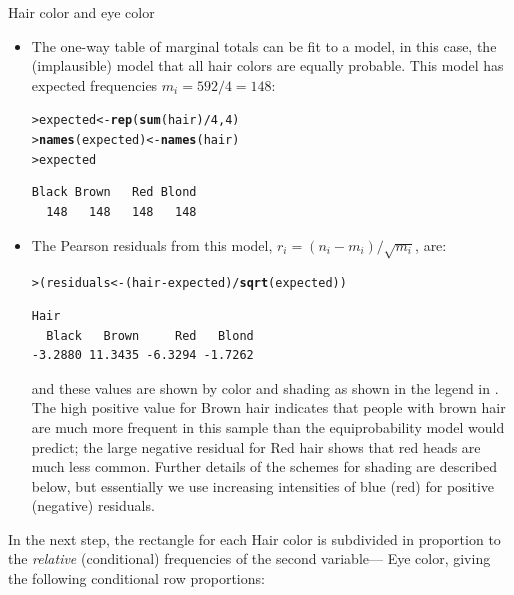 \documentclass[10pt,krantz2]{krantz}\usepackage[]{graphicx}\usepackage[]{color}
\makeatletter
\newcommand{\hlnum}[1]{\textcolor[rgb]{0.686,0.059,0.569}{#1}}%
\newcommand{\hlopt}[1]{\textcolor[rgb]{0,0,0}{#1}}%
\newcommand{\hlstd}[1]{\textcolor[rgb]{0.345,0.345,0.345}{#1}}%
\newcommand{\hlkwb}[1]{\textcolor[rgb]{0.69,0.353,0.396}{#1}}%
\newcommand{\hlkwd}[1]{\textcolor[rgb]{0.737,0.353,0.396}{\textbf{#1}}}%
\newenvironment{kframe}{%
 \def\at@end@of@kframe{}%
 \ifinner\ifhmode%
  \def\at@end@of@kframe{\end{minipage}}%
  \begin{minipage}{\columnwidth}%
 \fi\fi%
 \def\FrameCommand##1{\hskip\@totalleftmargin \hskip-\fboxsep
 \colorbox{shadecolor}{##1}\hskip-\fboxsep
     \hskip-\linewidth \hskip-\@totalleftmargin \hskip\columnwidth}%
 \MakeFramed {\advance\hsize-\width
   \@totalleftmargin\z@ \linewidth\hsize
   \@setminipage}}%
 {\par\unskip\endMakeFramed%
 \at@end@of@kframe}
\newenvironment{knitrout}{}{} %
\renewenvironment{knitrout}{\small\renewcommand{\baselinestretch}{.85}}{} %
\makeatother
\begin{document}
\begin{Example}[haireye2a]{Hair color and eye color}
\begin{itemize}
\item The one-way table of marginal totals can be fit to a model, in this
case, the (implausible) model that all hair colors are equally probable.  This model
has expected frequencies $m_i = 592/4 = 148$:
\begin{knitrout}
\color{fgcolor}\begin{kframe}
\begin{alltt}
\hlstd{> }\hlstd{expected} \hlkwb{<-} \hlkwd{rep}\hlstd{(}\hlkwd{sum}\hlstd{(hair)} \hlopt{/} \hlnum{4}\hlstd{,} \hlnum{4}\hlstd{)}
\hlstd{> }\hlkwd{names}\hlstd{(expected)} \hlkwb{<-} \hlkwd{names}\hlstd{(hair)}
\hlstd{> }\hlstd{expected}
\end{alltt}
\begin{verbatim}
Black Brown   Red Blond 
  148   148   148   148 
\end{verbatim}
\end{kframe}
\end{knitrout}
\item The Pearson residuals from this model, $r_i = ( n_i - m_i ) / \sqrt{m_i}$, are:
\begin{knitrout}
\color{fgcolor}\begin{kframe}
\begin{alltt}
\hlstd{> }\hlstd{(residuals} \hlkwb{<-} \hlstd{(hair} \hlopt{-} \hlstd{expected)} \hlopt{/} \hlkwd{sqrt}\hlstd{(expected))}
\end{alltt}
\begin{verbatim}
Hair
  Black   Brown     Red   Blond 
-3.2880 11.3435 -6.3294 -1.7262 
\end{verbatim}
\end{kframe}
\end{knitrout}
and these values are shown by color and shading as shown in the legend
in .
The high positive value for Brown hair indicates that people
with brown hair are much more frequent in this sample than
the equiprobability model would predict; the large negative residual
for Red hair shows that red heads are much less common.  Further details
of the schemes for shading are described below, but essentially we use
increasing intensities of blue (red) for positive (negative) residuals.
\end{itemize}

In the next step, the rectangle for each Hair color is subdivided in proportion
to the \emph{relative} (conditional) frequencies of the second variable---
Eye color, giving the following conditional row proportions:


\end{Example}
\end{document}
